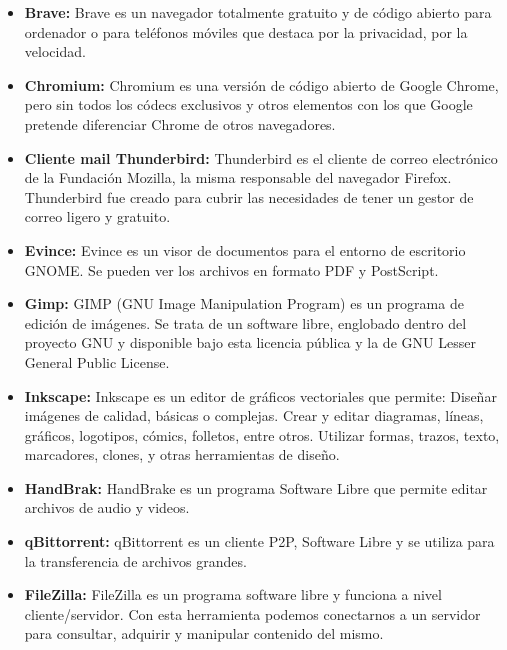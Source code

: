 		\begin{itemize}
			
			\item \textbf{Brave:} Brave es un navegador totalmente gratuito y de código abierto para ordenador o para teléfonos móviles que destaca por la privacidad, por la velocidad.\par 
			
			\item \textbf{Chromium:} Chromium es una versión de código abierto de Google Chrome, pero sin todos los códecs exclusivos y otros elementos con los que Google pretende diferenciar Chrome de otros navegadores.\par
				
			\item \textbf{Cliente mail Thunderbird:} Thunderbird es el cliente de correo electrónico de la Fundación Mozilla, la misma responsable del navegador Firefox. Thunderbird fue creado para cubrir las necesidades de tener un gestor de correo ligero y gratuito.

			\item \textbf{Evince:} Evince es un visor de documentos para el entorno de escritorio GNOME. Se pueden ver los archivos en formato PDF y PostScript.\par

			
			\item \textbf{Gimp:} GIMP (GNU Image Manipulation Program) es un programa de edición de imágenes. Se trata de un software libre, englobado dentro del proyecto GNU y disponible bajo esta licencia pública y la de GNU Lesser General Public License.
			
			\item \textbf{Inkscape:} Inkscape es un editor de gráficos vectoriales que permite: Diseñar imágenes de calidad, básicas o complejas. Crear y editar diagramas, líneas, gráficos, logotipos, cómics, folletos, entre otros. Utilizar formas, trazos, texto, marcadores, clones, y otras herramientas de diseño.
			
			\item \textbf{HandBrak:} HandBrake es un programa Software Libre que permite editar archivos de audio y videos. 
			
			\item \textbf{qBittorrent:} qBittorrent es un cliente P2P, Software Libre y se utiliza para la transferencia de archivos grandes.\par
							
			\item \textbf{FileZilla:} FileZilla es un programa software libre y funciona a nivel cliente/servidor. Con esta herramienta podemos conectarnos a un servidor para consultar, adquirir y manipular contenido del mismo.\par
		

\end{itemize}
